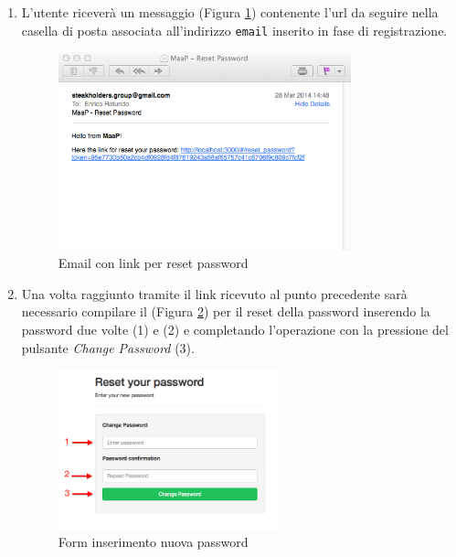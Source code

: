 \begin{enumerate}
			\item L'utente riceverà un messaggio (Figura \ref{fig:mailResetPwd}) contenente l'url da seguire nella casella di posta associata all'indirizzo \texttt{email} inserito in fase di registrazione. 

			\begin{figure}[H]
				\centering \includegraphics[width=0.8\textwidth]{img/mailResetPwd.png}
			\caption{ \label{fig:mailResetPwd} Email con link per reset password}
			\end{figure}

			\item Una volta raggiunto tramite  il link ricevuto al punto precedente sarà necessario compilare il  (Figura \ref{fig:resetPwdForm}) per il reset della password inserendo la password due volte (1) e (2) e completando l'operazione con la pressione del pulsante \emph{Change Password} (3).

			\begin{figure}[H]
				\centering \includegraphics[width=0.6\textwidth]{img/resetPwdForm.png}
			\caption{ \label{fig:resetPwdForm} Form inserimento nuova password}
			\end{figure}

		\end{enumerate}

